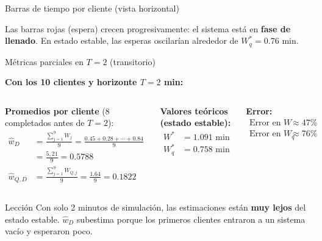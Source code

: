 \documentclass[aspectratio=1610, 9pt]{beamer}
\begin{document}
\begin{frame}{Barras de tiempo por cliente (vista horizontal)}
\begin{center}
\end{center}

\small
Las barras rojas (espera) crecen progresivamente: el sistema est\'{a} en \textbf{fase de llenado}. En estado estable, las esperas oscilar\'{i}an alrededor de $W_q^* = 0.76$ min.
\end{frame}

\begin{frame}{M\'{e}tricas parciales en $T = 2$ (transitorio)}

\textbf{Con los 10 clientes y horizonte $T = 2$ min:}

\vspace{0.2cm}
\begin{columns}
\textbf{Promedios por cliente} (8 completados antes de $T\!=\!2$):
\begin{align*}
\widehat{w}_D &= \frac{\sum_{j=1}^{9} W_j}{9} = \frac{0.45+0.28+\cdots+0.84}{9}\\
&= \frac{5,21}{9} = 0.5788 \\[4pt]
\widehat{w}_{Q,D} &= \frac{\sum_{j=1}^{9} W_{Q,j}}{9} = \frac{1.64}{9} = 0.1822 
\end{align*}

\textbf{Valores te\'{o}ricos (estado estable):}
\begin{align*}
W^* &= 1.091 \text{ min} \\
W_q^* &= 0.758 \text{ min}
\end{align*}

\vspace{0.2cm}
\textbf{Error:}
\begin{align*}
\text{Error en } W &\approx 47\% \\
\text{Error en } W_q &\approx 76\%
\end{align*}
\end{columns}

\vspace{0.3cm}
\begin{alertblock}{Lecci\'{o}n}
Con solo 2 minutos de simulaci\'{o}n, las estimaciones est\'{a}n \textbf{muy lejos} del estado estable. $\widehat{w}_D$ subestima porque los primeros clientes entraron a un sistema vac\'{i}o y esperaron poco.
\end{alertblock}
\end{frame}
\end{document}
